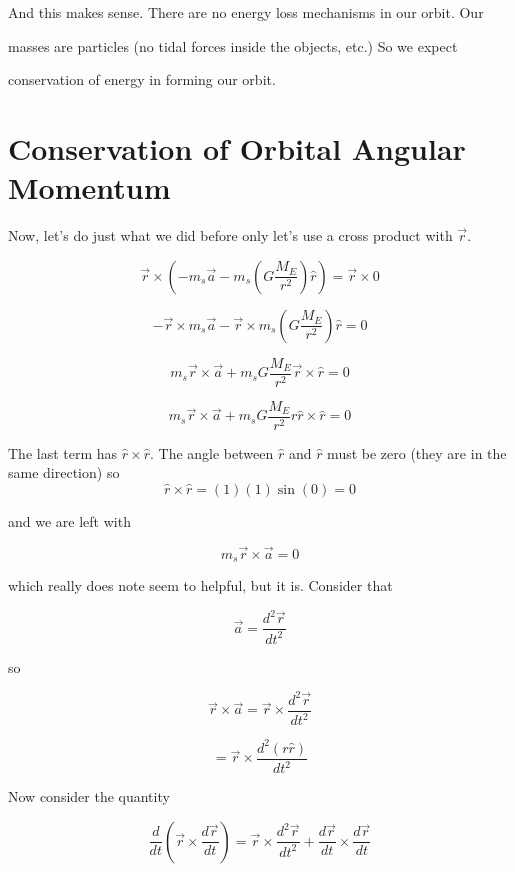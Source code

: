 And this makes sense. There are no energy loss mechanisms in our orbit. Our

masses are particles (no tidal forces inside the objects, etc.) So we expect

conservation of energy in forming our orbit.


\section{Conservation of Orbital Angular Momentum}


Now, let's do just what we did before only let's use a cross product with 
$\overrightarrow{r}$. 

$$\overrightarrow{r}\times \left( -m_{s}\overrightarrow{a}-m_{s}\left( G\frac{M_{E}}{r^{2}}\right) \hat{r}\right) =\overrightarrow{r}\times 0
$$

$$-\overrightarrow{r}\times m_{s}\overrightarrow{a}-\overrightarrow{r}\times m_{s}\left( G\frac{M_{E}}{r^{2}}\right) \hat{r}=0
$$

$$m_{s}\overrightarrow{r}\times \overrightarrow{a}+m_{s}G\frac{M_{E}}{r^{2}}\overrightarrow{r}\times \hat{r}=0
$$

$$m_{s}\overrightarrow{r}\times \overrightarrow{a}+m_{s}G\frac{M_{E}}{r^{2}}r\hat{r}\times \hat{r}=0
$$

The last term has $\hat{r}\times \hat{r}.$ The angle between $\hat{r}$ and $\hat{r}$ must be zero (they are in the same direction) so 
$$\hat{r}\times \hat{r}=\left( 1\right) \left( 1\right) \sin \left( 0\right) =0$$

and we are left with 

$$m_{s}\overrightarrow{r}\times \overrightarrow{a}=0$$

which really does note seem to helpful, but it is. Consider that 

$$\overrightarrow{a}=\frac{d^{2}\overrightarrow{r}}{dt^{2}}$$

so 

$$\overrightarrow{r}\times \overrightarrow{a}=\overrightarrow{r}\times \frac{d^{2}\overrightarrow{r}}{dt^{2}}$$

$$=\overrightarrow{r}\times \frac{d^{2}\left( r\hat{r}\right) }{dt^{2}}$$


Now consider the quantity 

$$\frac{d}{dt}\left( \overrightarrow{r}\times \frac{d\overrightarrow{r}}{dt}\right)=\overrightarrow{r}\times\frac{d^{2}\overrightarrow{r}}{dt^{2}}+\frac{d\overrightarrow{r}}{dt}\times \frac{d\overrightarrow{r}}{dt}$$

